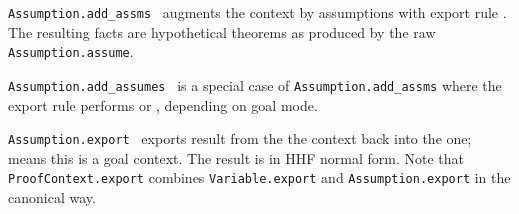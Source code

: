 \begin{isabellebody}
\begin{isamarkuptext}
\begin{description}
  \item \verb|Assumption.add_assms|~ augments the context
  by assumptions  with export rule .  The
  resulting facts are hypothetical theorems as produced by the raw
  \verb|Assumption.assume|.

  \item \verb|Assumption.add_assumes|~ is a special case of
  \verb|Assumption.add_assms| where the export rule performs  or , depending on goal
  mode.

  \item \verb|Assumption.export|~
  exports result  from the the  context
  back into the  one;  means
  this is a goal context.  The result is in HHF normal form.  Note
  that \verb|ProofContext.export| combines \verb|Variable.export|
  and \verb|Assumption.export| in the canonical way.


\end{description}
\end{isamarkuptext}
\end{isabellebody}
